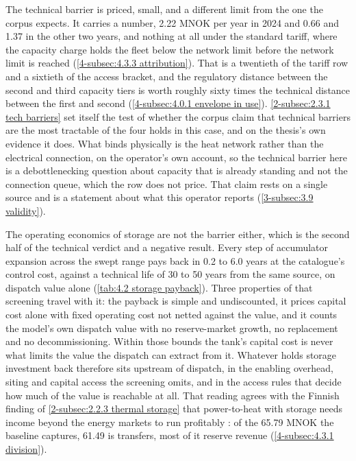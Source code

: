The technical barrier is priced, small, and a different limit from the one the corpus expects. It carries a number, 2.22 MNOK per year in 2024 and 0.66 and 1.37 in the other two years, and nothing at all under the standard tariff, where the capacity charge holds the fleet below the network limit before the network limit is reached (\autoref{4-subsec:4.3.3 attribution}). That is a twentieth of the tariff row and a sixtieth of the access bracket, and the regulatory distance between the second and third capacity tiers is worth roughly sixty times the technical distance between the first and second (\autoref{4-subsec:4.0.1 envelope in use}). \autoref{2-subsec:2.3.1 tech barriers} set itself the test of whether the corpus claim that technical barriers are the most tractable of the four holds in this case, and on the thesis's own evidence it does. What binds physically is the heat network rather than the electrical connection, on the operator's own account, so the technical barrier here is a debottlenecking question about capacity that is already standing and not the connection queue, which the row does not price. That claim rests on a single source and is a statement about what this operator reports (\autoref{3-subsec:3.9 validity}).

The operating economics of storage are not the barrier either, which is the second half of the technical verdict and a negative result. Every step of accumulator expansion across the swept range pays back in 0.2 to 6.0 years at the catalogue's control cost, against a technical life of 30 to 50 years from the same source, on dispatch value alone (\autoref{tab:4.2 storage payback}). Three properties of that screening travel with it: the payback is simple and undiscounted, it prices capital cost alone with fixed operating cost not netted against the value, and it counts the model's own dispatch value with no reserve-market growth, no replacement and no decommissioning. Within those bounds the tank's capital cost is never what limits the value the dispatch can extract from it. Whatever holds storage investment back therefore sits upstream of dispatch, in the enabling overhead, siting and capital access the screening omits, and in the access rules that decide how much of the value is reachable at all. That reading agrees with the Finnish finding of \autoref{2-subsec:2.2.3 thermal storage} that power-to-heat with storage needs income beyond the energy markets to run profitably \cite{jaanto_thermal_2023}: of the 65.79 MNOK the baseline captures, 61.49 is transfers, most of it reserve revenue (\autoref{4-subsec:4.3.1 division}).

